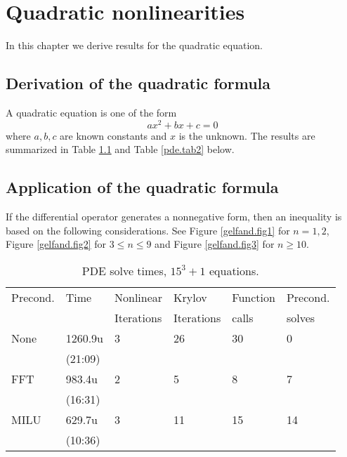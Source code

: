 \chapter{Quadratic nonlinearities}\label{quad}
%
%
In this chapter we derive results for the quadratic equation.

\section{Derivation of the quadratic formula}
A quadratic equation is one of the form
\begin{equation}\label{quadratic}
ax^2 + bx + c = 0
\end{equation}
where $a,b,c$ are known constants and $x$ is the unknown.
The results are summarized in Table \ref{pde.tab1} and Table
\ref{pde.tab2} below.

%
%
\section{Application of the quadratic formula}
%
%

If the differential operator generates a nonnegative form, then an
inequality is based on the following considerations. See
Figure \ref{gelfand.fig1} for $n=1,2$,
Figure \ref{gelfand.fig2} for $3\leq n \leq 9$
and
Figure \ref{gelfand.fig3} for $n\geq 10$.

%
\begin{table}[b]
\centering
\caption{\label{timing1} PDE solve times, $15^3+1$
equations.\label{pde.tab1}}
\plusline
\begin{tabular}{||l|l|l|l|l|l||}\hline
Precond. & Time & Nonlinear & Krylov
& Function & Precond. \\
 & & Iterations & Iterations & calls & solves \\ \hline
None & 1260.9u & 3 & 26 & 30 & 0  \\
 &(21:09) & & & &  \\ \hline
FFT  & 983.4u & 2  & 5  & 8  & 7 \\
&(16:31) & & & & \\ \hline
MILU & 629.7u & 3  & 11 & 15 & 14 \\
& (10:36) & & & & \\ \hline
\end{tabular}
\end{table}
\clearpage

